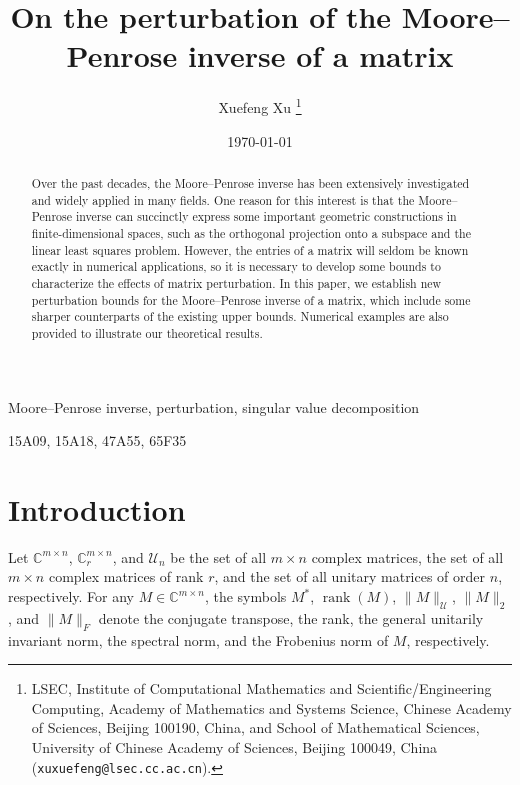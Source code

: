 \documentclass[11pt]{article}
\DeclareMathOperator*{\rank}{rank}
\begin{document}
	
\title{On the perturbation of the Moore--Penrose inverse of a matrix}
%
\author{
Xuefeng Xu%
\thanks{LSEC, Institute of Computational Mathematics and Scientific/Engineering Computing, Academy of Mathematics and Systems Science, Chinese Academy of Sciences, Beijing 100190, China, and School of Mathematical Sciences, University of Chinese Academy of Sciences, Beijing 100049, China (\texttt{xuxuefeng@lsec.cc.ac.cn}).}
}
%
\date{\today}
%	
\maketitle
	
\begin{abstract}

Over the past decades, the Moore--Penrose inverse has been extensively investigated and widely applied in many fields. One reason for this interest is that the Moore--Penrose inverse can succinctly express some important geometric constructions in finite-dimensional spaces, such as the orthogonal projection onto a subspace and the linear least squares problem. However, the entries of a matrix will seldom be known exactly in numerical applications, so it is necessary to develop some bounds to characterize the effects of matrix perturbation. In this paper, we establish new perturbation bounds for the Moore--Penrose inverse of a matrix, which include some sharper counterparts of the existing upper bounds. Numerical examples are also provided to illustrate our theoretical results.

\end{abstract}
	
 Moore--Penrose inverse, perturbation, singular value decomposition

\medskip

 15A09, 15A18, 47A55, 65F35

\section{Introduction}

Let $\mathbb{C}^{m\times n}$, $\mathbb{C}^{m\times n}_{r}$, and $\mathscr{U}_{n}$ be the set of all $m\times n$ complex matrices, the set of all $m\times n$ complex matrices of rank $r$, and the set of all unitary matrices of order $n$, respectively. For any $M\in\mathbb{C}^{m\times n}$, the symbols $M^{\ast}$, $\rank(M)$, $\|M\|_{\mathscr{U}}$, $\|M\|_{2}$, and $\|M\|_{F}$ denote the conjugate transpose, the rank, the general unitarily invariant norm, the spectral norm, and the Frobenius norm of $M$, respectively.
\end{document}
